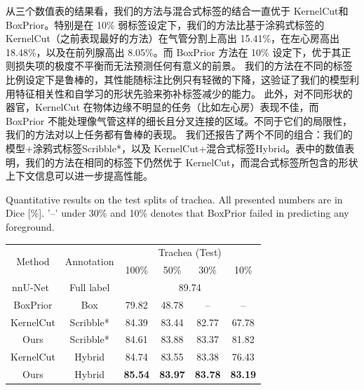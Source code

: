 从三个数值表的结果看，我们的方法与混合式标签的结合一直优于 KernelCut\citet{tang2018regularized}和 BoxPrior\citet{kervadec2020bounding}。特别是在 10\% 弱标签设定下，我们的方法比基于涂鸦式标签的 KernelCut（之前表现最好的方法）在气管分割上高出 15.41\%，在左心房高出 18.48\%，以及在前列腺高出 8.05\%。而 BoxPrior 方法在 10\% 设定下，优于其正则损失项的极度不平衡而无法预测任何有意义的前景。
我们的方法在不同的标签比例设定下是鲁棒的，其性能随标注比例只有轻微的下降，这验证了我们的模型利用特征相关性和自学习的形状先验来弥补标签减少的能力。
此外，对不同形状的器官，KernelCut 在物体边缘不明显的任务（比如左心房）表现不佳，而 BoxPrior 不能处理像气管这样的细长且分叉连接的区域。不同于它们的局限性，我们的方法对以上任务都有鲁棒的表现。
我们还报告了两个不同的组合：我们的模型+涂鸦式标签Scribble*，以及 KernelCut+混合式标签Hybrid。表中的数值表明，我们的方法在相同的标签下仍然优于 KernelCut，而混合式标签所包含的形状上下文信息可以进一步提高性能。


    \begin{table}[t!]
        {Quantitative results on the test splits of trachea. All presented numbers are in Dice [\%]. '--' under 30\% and 10\% denotes that BoxPrior failed in predicting any foreground.}
        \centering    
            \begin{tabular}{c|c|c c c c }
                \toprule
                \multirow{2}{*}{Method} & \multirow{2}{*}{Annotation} & \multicolumn{4}{c}{Trachea (Test)}  \\ 
                &                        & 100\% & 50\% & 30\% & 10\%                             \\ \midrule
                nnU-Net~\cite{isensee2019automated}     & Full label        & \multicolumn{4}{c}{89.74}          \\ \cmidrule{1-6}
                BoxPrior\cite{kervadec2020bounding}    & Box  & 79.82  & 48.78  & -- & --  \\
                KernelCut\cite{tang2018regularized}   & Scribble* & 84.39  & 83.44  & 82.77  & 67.78  \\
                Ours & Scribble* & 84.61 & 83.88 & 83.37 & 81.82  \\
                KernelCut\cite{tang2018regularized}   & Hybrid & 84.74 & 83.55	& 83.38	& 76.43             \\
                Ours        & Hybrid    & \textbf{85.54} & \textbf{83.97} & \textbf{83.78} & \textbf{83.19}                           \\
                \bottomrule
            \end{tabular}
        
        \label{tab:test_res1}
    \end{table}


